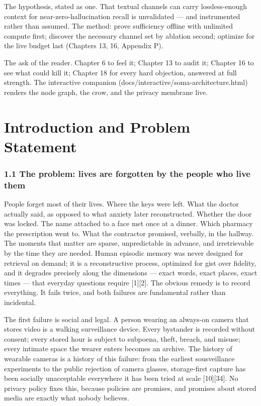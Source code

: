 The hypothesis, stated as one. That textual channels can carry lossless-enough context for near-zero-hallucination recall is unvalidated --- and instrumented rather than assumed. The method: prove sufficiency offline with unlimited compute first; discover the necessary channel set by ablation second; optimize for the live budget last (Chapters 13, 16, Appendix P).

The ask of the reader. Chapter 6 to feel it; Chapter 13 to audit it; Chapter 16 to see what could kill it; Chapter 18 for every hard objection, answered at full strength. The interactive companion (docs/interactive/soma-architecture.html) renders the node graph, the crow, and the privacy membrane live.

\chapter{Introduction and Problem Statement}\label{introduction-and-problem-statement}

\subsection{1.1 The problem: lives are forgotten by the people who live them}\label{the-problem-lives-are-forgotten-by-the-people-who-live-them}

People forget most of their lives. Where the keys were left. What the doctor actually said, as opposed to what anxiety later reconstructed. Whether the door was locked. The name attached to a face met once at a dinner. Which pharmacy the prescription went to. What the contractor promised, verbally, in the hallway. The moments that matter are sparse, unpredictable in advance, and irretrievable by the time they are needed. Human episodic memory was never designed for retrieval on demand; it is a reconstructive process, optimized for gist over fidelity, and it degrades precisely along the dimensions --- exact words, exact places, exact times --- that everyday questions require {[}1{]}{[}2{]}. The obvious remedy is to record everything. It fails twice, and both failures are fundamental rather than incidental.

The first failure is social and legal. A person wearing an always-on camera that stores video is a walking surveillance device. Every bystander is recorded without consent; every stored hour is subject to subpoena, theft, breach, and misuse; every intimate space the wearer enters becomes an archive. The history of wearable cameras is a history of this failure: from the earliest sousveillance experiments to the public rejection of camera glasses, storage-first capture has been socially unacceptable everywhere it has been tried at scale {[}10{]}{[}34{]}. No privacy policy fixes this, because policies are promises, and promises about stored media are exactly what nobody believes.

